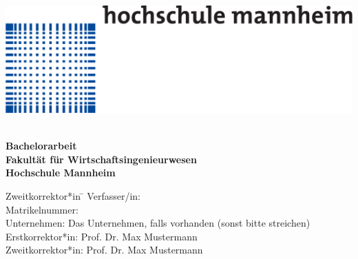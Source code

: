 \begin{titlepage}
\begin{minipage}{\textwidth}
		\vspace{-2cm}
		\noindent \includegraphics[scale=0.3]{img/logo.pdf}
\end{minipage}
\vspace{3em}

\begin{center}
	{\textbf{\Large{}\TheThesisTitle}}\\[5em]
	{\textbf{\large{}Bachelorarbeit}}\\[2em]
	{\textbf{Fakultät für Wirtschaftsingenieurwesen}\\[.5em] \textbf{Hochschule Mannheim}}
	
	\vspace{3em}
\vfill

\begin{minipage}{\textwidth}

\begin{tabbing}
	Zweitkorrektor*in \hspace{0.85cm}\=\kill
	Verfasser/in: \> \TheThesisAuthor \\[1.5mm]
	Matrikelnummer:  \\[1.5mm]
	Unternehmen: \> Das Unternehmen, falls vorhanden (sonst bitte streichen)  \\[1.5mm]
	Erstkorrektor*in: \> Prof. Dr. Max Mustermann \\[1.5mm]
	Zweitkorrektor*in: \> Prof. Dr. Max Mustermann \\[1.5mm]

\end{tabbing}
\end{minipage}

\end{center}

\end{titlepage}